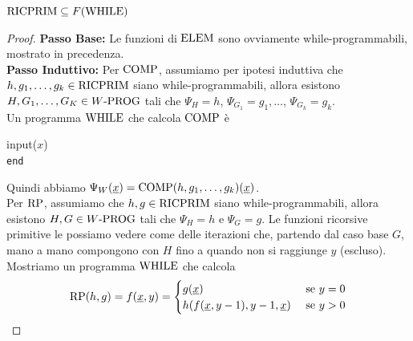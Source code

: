 \begin{theor}
	$\text{RICPRIM} \subseteq F(\text{WHILE})$
\end{theor}
\begin{proof}
	\textbf{Passo Base:} Le funzioni di $\text{ELEM}$ sono ovviamente while-programmabili, mostrato in precedenza.\\
	
	\textbf{Passo Induttivo:} Per $\text{COMP}$, assumiamo per ipotesi induttiva che $h,g_1, \dots, g_k \in \text{RICPRIM}$ siano while-programmabili, allora esistono $H, G_1, \dots, G_K \in W\text{-PROG}$ tali che $\Psi_H = h$, $\Psi_{G_1} = g_1, \dots$, $\Psi_{G_k} = g_k$.\\
	Un programma $\text{WHILE}$ che calcola $\text{COMP}$ è
	
	\begin{center}
		\begin{minipage}{0.85\textwidth}
			\begin{tcolorbox}[colback=white,sharp corners,boxrule=.3mm]
				\begin{algorithm}[H]
					\SetAlgoNoEnd
					input($x$) \\
					\texttt{end}
				\end{algorithm}
			\end{tcolorbox}
		\end{minipage}
	\end{center}
	
	Quindi abbiamo $\Psi_W (\underline{x}) = \text{COMP} (h, g_1, \dots, g_k) (\underline{x})$.\\
	
	Per $\text{RP}$, assumiamo che $h,g \in \text{RICPRIM}$ siano while-programmabili, allora esistono $H,G \in W\text{-PROG}$ tali che $\Psi_H = h$ e $\Psi_G = g$. Le funzioni ricorsive primitive le possiamo vedere come delle iterazioni che, partendo dal caso base $G$, mano a mano compongono con $H$ fino a quando non si raggiunge $y$ (escluso). Mostriamo un programma $\text{WHILE}$ che calcola
	$$ 
	\text{RP} (h,g) = f(\underline{x}, y) = \begin{cases}
		g(\underline{x}) & \text{ se } y = 0 \\
		h(f(\underline{x}, y-1), y-1, \underline{x}) & \text{ se } y > 0
	\end{cases}
	$$
	

\end{proof}
